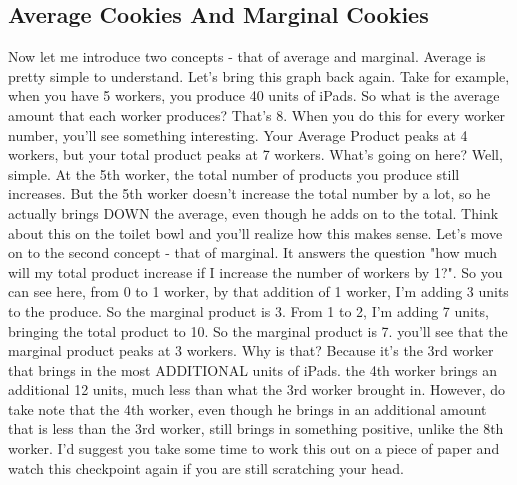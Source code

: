 \subsection{Average Cookies And Marginal Cookies}
Now let me introduce two concepts - that of average and marginal. Average is pretty simple to understand. Let's bring this graph back again. Take for example, when you have 5 workers, you produce 40 units of iPads. So what is the average amount that each worker produces? That's 8. When you do this for every worker number, you'll see something interesting. Your Average Product peaks at 4 workers, but your total product peaks at 7 workers. What's going on here? Well, simple. At the 5th worker, the total number of products you produce still increases. But the 5th worker doesn't increase the total number by a lot, so he actually brings DOWN the average, even though he adds on to the total. Think about this on the toilet bowl and you'll realize how this makes sense. Let's move on to the second concept - that of marginal. It answers the question "how much will my total product increase if I increase the number of workers by 1?". So you can see here, from 0 to 1 worker, by that addition of 1 worker, I'm adding 3 units to the produce. So the marginal product is 3. From 1 to 2, I'm adding 7 units, bringing the total product to 10. So the marginal product is 7. you'll see that the marginal product peaks at 3 workers. Why is that? Because it's the 3rd worker that brings in the most ADDITIONAL units of iPads. the 4th worker brings an additional 12 units, much less than what the 3rd worker brought in. However, do take note that the 4th worker, even though he brings in an additional amount that is less than the 3rd worker, still brings in something positive, unlike the 8th worker. I'd suggest you take some time to work this out on a piece of paper and watch this checkpoint again if you are still scratching your head.
